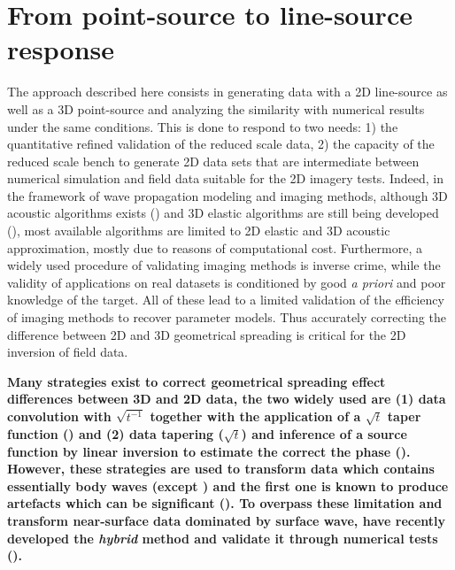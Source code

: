 \documentclass[extra,mreferee]{gji}
\newenvironment{violetnote}{\par\color{BlueViolet}}{\par}
\begin{document}
\begin{violetnote}
\section{From point-source to line-source response}

The approach described here consists in generating data with a 2D line-source as well as a 3D point-source and analyzing the similarity with numerical results under the same conditions. This is done to respond to two needs: 1) the quantitative refined validation of the reduced scale data, 2) the capacity of the reduced scale bench to generate 2D data sets that are intermediate between numerical simulation and field data suitable for the 2D imagery tests. Indeed, in the framework of wave propagation modeling and imaging methods, although 3D acoustic algorithms exists (\cite{benhadjali_FWI_2008,plessix_FWI_2010}) and 3D elastic algorithms are still being developed (\cite{castellanos_AMD_2011,borisov2015three}), most available algorithms are limited to 2D elastic and 3D acoustic approximation, mostly due to reasons of computational cost. Furthermore, a widely used procedure of validating imaging methods is inverse crime, while the validity of applications on real datasets is conditioned by good \textit{a priori} and poor knowledge of the target. All of these lead to a limited validation of the efficiency of imaging methods to recover parameter models. Thus accurately correcting the difference between 2D and 3D geometrical spreading is critical for the 2D inversion of field data.

\textbf{Many strategies exist to correct geometrical spreading effect differences between 3D and 2D data, the two widely used are (1) data convolution with $\sqrt{t^{-1}}$ together with the application of a $\sqrt{t}$ taper function (\cite{crase1990robust,shipp2002two,ravaut2004multiscale}) and (2) data tapering ($\sqrt{t}$) and inference of a source function by linear inversion to estimate the correct the phase (\cite{pratt1999fwi,bretaudeau2013fwi}). However, these strategies are used to transform data which contains essentially body waves (except \cite{bretaudeau2013fwi}) and the first one is known to produce artefacts which can be significant (\cite{auer2013critical}). To overpass these limitation and transform near-surface data dominated by surface wave, \cite{Forbriger_LSS_2014} have recently developed the \textit{hybrid} method and validate it through numerical tests (\cite{schafer2014lss}).}


\end{violetnote}
\end{document}
